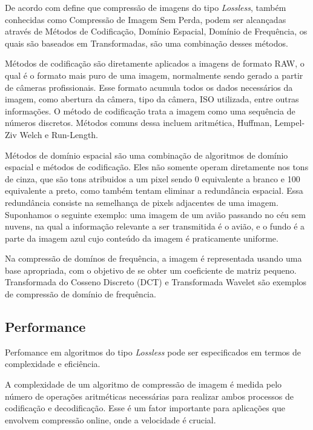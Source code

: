 De acordo com \citeauthor{losslessmethods} define que compressão de imagens do tipo {\em Lossless}, também conhecidas como Compressão de Imagem Sem Perda, podem ser alcançadas através de Métodos de Codificação, Domínio Espacial, Domínio de Frequência, os quais são baseados em Transformadas, são uma combinação desses métodos.

Métodos de codificação são diretamente aplicados a imagens de formato RAW, o qual é o formato mais puro de uma imagem, normalmente sendo gerado a partir de câmeras profissionais. Esse formato acumula todos os dados necessários da imagem, como abertura da câmera, tipo da câmera, ISO utilizada, entre outras informações. O método de codificação trata a imagem como uma sequência de números discretos. Métodos comuns dessa incluem aritmética, Huffman, Lempel-Ziv Welch e Run-Length.

Métodos de domínio espacial são uma combinação de algoritmos de domínio espacial e métodos de codificação. Eles não somente operam diretamente nos tons de cinza, que são tons atribuidos a um pixel sendo 0 equivalente a branco e 100 equivalente a preto, como também tentam eliminar a redundância espacial. Essa redundância consiste na semelhança de pixels adjacentes de uma imagem. Suponhamos o seguinte exemplo: uma imagem de um avião passando no céu sem nuvens, na qual a informação relevante a ser transmitida é o avião, e o fundo é a parte da imagem azul cujo conteúdo da imagem é praticamente uniforme.

Na compressão de domínos de frequência, a imagem é representada usando uma base apropriada, com o objetivo de se obter um coeficiente de matriz pequeno. Transformada do Cosseno Discreto (DCT) e Transformada Wavelet são exemplos de compressão de domínio de frequência.

\subsection{Performance}
\label{ss.losslessperformance}

Perfomance em algoritmos do tipo {\em Lossless} pode ser especificados em termos de complexidade e eficiência.

A complexidade de um algoritmo de compressão de imagem é medida pelo número de operações aritméticas necessárias para realizar ambos processos de codificação e decodificação. Esse é um fator importante para aplicações que envolvem compressão online, onde a velocidade é crucial.

